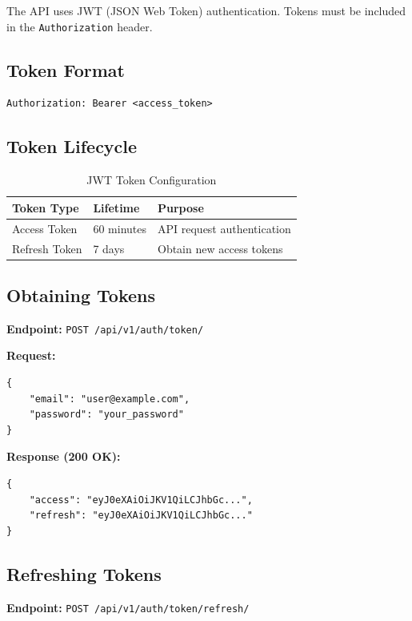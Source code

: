 \documentclass[11pt,a4paper]{article}
\begin{document}
The API uses JWT (JSON Web Token) authentication. Tokens must be included in the \texttt{Authorization} header.

\subsection{Token Format}

\begin{lstlisting}[style=bash]
Authorization: Bearer <access_token>
\end{lstlisting}

\subsection{Token Lifecycle}

\begin{table}[H]
\centering
\begin{tabular}{@{}lll@{}}
\toprule
\textbf{Token Type} & \textbf{Lifetime} & \textbf{Purpose} \\
\midrule
Access Token & 60 minutes & API request authentication \\
Refresh Token & 7 days & Obtain new access tokens \\
\bottomrule
\end{tabular}
\caption{JWT Token Configuration}
\end{table}

\subsection{Obtaining Tokens}

\textbf{Endpoint:} \texttt{POST /api/v1/auth/token/}

\textbf{Request:}
\begin{lstlisting}[style=json]
{
    "email": "user@example.com",
    "password": "your_password"
}
\end{lstlisting}

\textbf{Response (200 OK):}
\begin{lstlisting}[style=json]
{
    "access": "eyJ0eXAiOiJKV1QiLCJhbGc...",
    "refresh": "eyJ0eXAiOiJKV1QiLCJhbGc..."
}
\end{lstlisting}

\subsection{Refreshing Tokens}

\textbf{Endpoint:} \texttt{POST /api/v1/auth/token/refresh/}
\end{document}
